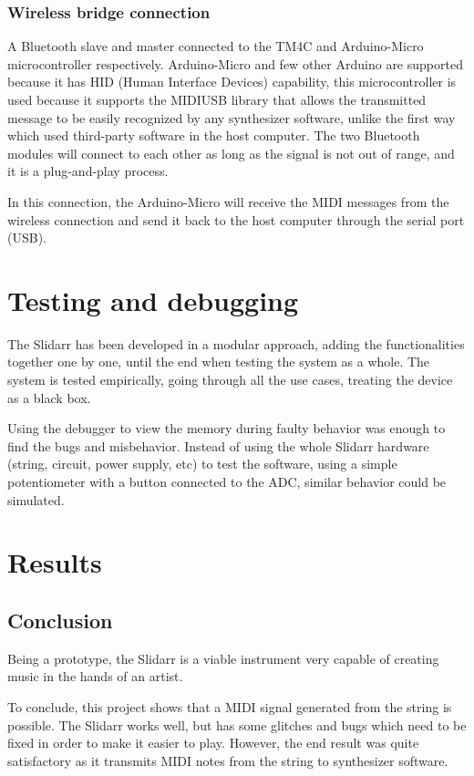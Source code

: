 \documentclass{article}
\begin{document}
\subsubsection{Wireless bridge connection}
A Bluetooth slave and master connected to the TM4C and Arduino-Micro microcontroller respectively. Arduino-Micro and few other Arduino are supported because it has HID (Human Interface Devices) capability, this microcontroller is used because it supports the MIDIUSB library \cite{arduinolibraries} that allows the transmitted message to be easily recognized by any synthesizer software, unlike the first way which used third-party software in the host computer. The two Bluetooth modules will connect to each other as long as the signal is not out of range, and it is a plug-and-play process.

In this connection, the Arduino-Micro will receive the MIDI messages from the wireless connection and send it back to the host computer through the serial port (USB). 

\section{Testing and debugging}
The Slidarr has been developed in a modular approach, adding the functionalities together one by one, until the end when testing the system as a whole. The system is tested empirically, going through all the use cases, treating the device as a black box.

Using the debugger to view the memory during faulty behavior was enough to find the bugs and misbehavior. Instead of using the whole Slidarr hardware (string, circuit, power supply, etc) to test the software, using a simple potentiometer with a button connected to the ADC, similar behavior could be simulated.

\section{Results}

\subsection{Conclusion}
Being a prototype, the Slidarr is a viable instrument very capable of creating music in the hands of an artist.

To conclude, this project shows that a MIDI signal generated from the string is possible.
The Slidarr works well, but has some glitches and bugs which need to be fixed in order to make it easier to play. However, the end result was quite satisfactory as it transmits MIDI notes from the string to synthesizer software.
\end{document}
